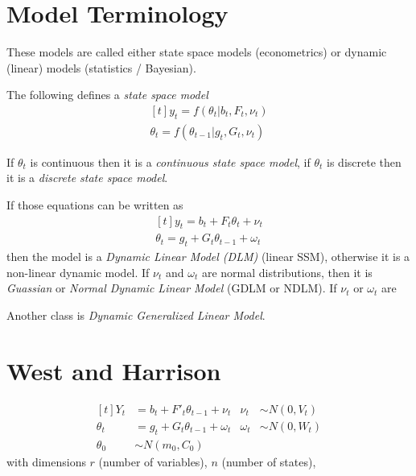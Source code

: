 \documentclass{article}
\begin{document}
\section{Model Terminology}


These models are called either state space models (econometrics) or
dynamic (linear) models (statistics / Bayesian).

The following defines a \emph{state space model} 
\begin{equation*}
  \begin{aligned}[t]
    y_t = f(\theta_t \vert  b_{t}, F_t, \nu_t) \\
    \theta_t = f(\theta_{t-1} \vert g_{t},  G_t, \nu_t)
  \end{aligned}
\end{equation*}

If $\theta_t$ is continuous then it is a \emph{continuous state space
model}, if $\theta_t$ is discrete then it is a \emph{discrete state
space model}.

If those equations can be written as 
\begin{equation*}
\begin{aligned}[t]
y_t = b_{t} + F_t \theta_t + \nu_t \\
\theta_t = g_{t} + G_t \theta_{t-1} + \omega_t
\end{aligned}
\end{equation*}
then the model is a \emph{Dynamic Linear Model (DLM)} (linear SSM),
otherwise it is a non-linear dynamic model. If $\nu_t$ and $\omega_t$
are normal distributions, then it is \emph{Guassian} or \emph{Normal
Dynamic Linear Model} (GDLM or NDLM). If $\nu_t$ or $\omega_t$ are

Another class is \emph{Dynamic Generalized Linear Model}.

\section{West and Harrison}

\begin{equation*}
\begin{aligned}[t]
Y_t &= b_{t} + F'_t \theta_{t-1} + \nu_t & \nu_t & \sim N(0, V_t) \\
\theta_t &= g_{t} + G_t \theta_{t-1} + \omega_t & \omega_t & \sim N(0, W_t) \\
\theta_0 &\sim N(m_0, C_0)
\end{aligned}
\end{equation*}
with dimensions $r$ (number of variables), $n$ (number of states),
\end{document}
